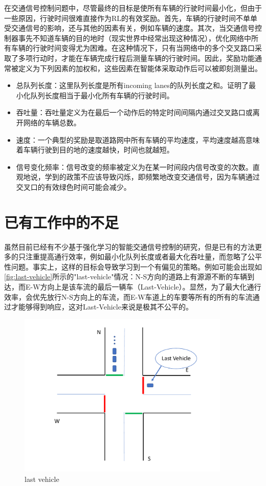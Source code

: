 在交通信号控制问题中，尽管最终的目标是使所有车辆的行驶时间最小化，但由于一些原因，行驶时间很难直接作为RL的有效奖励。首先，车辆的行驶时间不单单受交通信号的影响，还与其他的因素有关，例如车辆的速度。其次，当交通信号控制器事先不知道车辆的目的地时（现实世界中经常出现这种情况），优化网络中所有车辆的行驶时间变得尤为困难。在这种情况下，只有当网络中的多个交叉路口采取了多项行动时，才能在车辆完成行程后测量车辆的行驶时间。因此，奖励功能通常被定义为下列因素的加权和，这些因素在智能体采取动作后可以被即刻测量出。
\begin{itemize}
  \item 总队列长度：这里队列长度是所有incoming lanes的队列长度之和。证明了最小化队列长度相当于最小化所有车辆的行驶时间。
  \item 吞吐量：吞吐量定义为在最后一个动作后的特定时间间隔内通过交叉路口或离开网络的车辆总数。
  \item 速度：一个典型的奖励是取道路网中所有车辆的平均速度，平均速度越高意味着车辆行驶到目的地的速度越快，时间也就越短。
  \item 信号变化频率：信号改变的频率被定义为在某一时间段内信号改变的次数。直观地说，学到的政策不应该导致闪烁，即频繁地改变交通信号，因为车辆通过交叉口的有效绿色时间可能会减少。
\end{itemize}
\section{已有工作中的不足}
虽然目前已经有不少基于强化学习的智能交通信号控制的研究，但是已有的方法更多的只注重提高通行效率，例如最小化队列长度或者最大化吞吐量，而忽略了公平性问题。事实上，这样的目标会导致学习到一个有偏见的策略。例如可能会出现如\autoref{fig:last-vehicle}所示的"last-vehicle"情况：N-S方向的道路上有源源不断的车辆到达，而E-W方向上是该车流的最后一辆车（Last-Vehicle）。显然，为了最大化通行效率，会优先放行N-S方向上的车流，而E-W车道上的车要等所有的所有的车流通过才能够得到响应，这对Last-Vehicle来说是极其不公平的。

\begin{figure}[t]
  \includegraphics[width=0.9\textwidth]{fig/lastvehicle.pdf}
  \caption{last vehicle}
  \label{fig:last-vehicle}
\end{figure}

